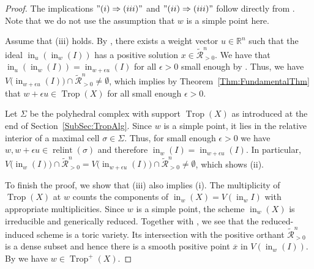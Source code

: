 \documentclass{article}
\theoremstyle{definition}
\DeclareMathOperator{\initial}{in}
\DeclareMathOperator{\Trop}{Trop}
\DeclareMathOperator{\relint}{relint}
\newcommand{\R}{\mathbb{R}}
\newcommand{\inw}{\operatorname{in}_w}
\begin{document}
\begin{proof}
The implications $"(i) \Rightarrow (iii)"$ and $"(ii) \Rightarrow (iii)"$ follow directly from . 
Note that we do not use the assumption that $w$ is a simple point here.

Assume that (iii) holds. By , there exists a weight vector $u \in \R^n$ such that the ideal $\initial_u(\initial_w(I))$ has a positive solution $x \in \widetilde{\mathcal{R}}_{>0}^n$.
We have that $\initial_u(\initial_w(I)) = \initial_{w + \epsilon u}(I)$ for all $\epsilon > 0$ small enough by \cite[Corollary 2.4.10]{maclagan2015introduction}. 
   Thus, we have $V\big( \initial_{w+\epsilon u}(I) \big) \cap \widetilde{\mathcal{R}}^{n}_{>0} \neq \emptyset$, which implies by Theorem~\ref{Thm:FundamentalThm} that $w + \epsilon u \in \Trop(X)$ for all small enough $\epsilon > 0$.

Let $\Sigma$ be the polyhedral complex with support $\Trop(X)$ as introduced at the end of Section~\ref{SubSec:TropAlg}.
Since $w$ is a simple point, it lies in the relative interior of a maximal cell $\sigma \in \Sigma$. Thus, for small enough $\epsilon > 0$ we have $w,w + \epsilon u \in \relint(\sigma)$  and therefore $\inw(I) = \initial_{w + \epsilon u}(I)$.
 In particular,  $V\big( \initial_{w}(I) \big) \cap \widetilde{\mathcal{R}}^{n}_{>0} = V\big( \initial_{w+\epsilon u}(I) \big) \cap \widetilde{\mathcal{R}}^{n}_{>0} \neq \emptyset$, which shows (ii).

    To finish the proof, we show that (iii) also implies (i).
    The multiplicity of $\Trop(X)$ at $w$ counts the components of $\inw(X) = V(\inw I)$ with appropriate multiplicities. Since $w$ is a simple point, the scheme $\inw(X)$ is irreducible and generically reduced.
    Together with \cite[Lemma 2.7]{Bossinger2017}, we see that the reduced-induced scheme is a toric variety. Its intersection with the positive orthant $\widetilde{\mathcal{R}}^{n}_{>0}$ is a dense subset
    and hence there is a smooth positive point $\overline{x}$ in $V(\inw (I))$.
    By  we have $w \in  \Trop^+(X)$.
    \end{proof}
\end{document}
